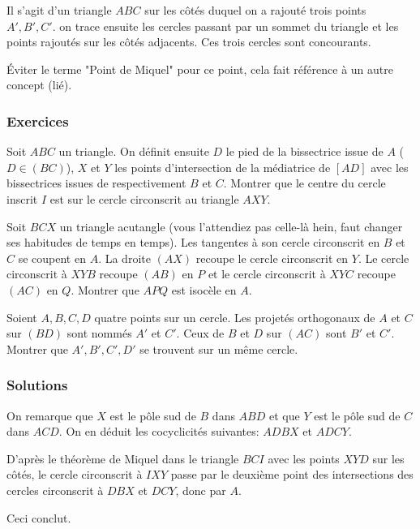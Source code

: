 Il s'agit d'un triangle $ABC$ sur les côtés duquel on a rajouté trois points $A',B',C'$. on trace ensuite les cercles passant par un sommet du triangle et les points rajoutés sur les côtés adjacents. Ces trois cercles sont concourants.

Éviter le terme "Point de Miquel" pour ce point, cela fait référence à un autre concept (lié).


\subsubsection{Exercices}


\begin{exo}
Soit $ABC$ un triangle. On définit ensuite $D$ le pied de la bissectrice issue de $A$ ($D\in(BC)$), $X$ et $Y$ les points d'intersection de la médiatrice de $[AD]$ avec les bissectrices issues de respectivement $B$ et $C$. Montrer que le centre du cercle inscrit $I$ est sur le cercle circonscrit au triangle $AXY$.
\end{exo}


\begin{exo}
Soit $BCX$ un triangle acutangle (vous l'attendiez pas celle-là hein, faut changer ses habitudes de temps en temps). Les tangentes à son cercle circonscrit en $B$ et $C$ se coupent en $A$. La droite $(AX)$ recoupe le cercle circonscrit en $Y$. Le cercle circonscrit à $XYB$ recoupe $(AB)$ en $P$ et le cercle circonscrit à $XYC$ recoupe $(AC)$ en $Q$. Montrer que $APQ$ est isocèle en $A$.
\end{exo}


\begin{exo}
Soient $A,B,C,D$ quatre points sur un cercle. Les projetés orthogonaux de $A$ et $C$ sur $(BD)$ sont nommés $A'$ et $C'$. Ceux de $B$ et $D$ sur $(AC)$ sont $B'$ et $C'$. Montrer que $A',B',C',D'$ se trouvent sur un même cercle.
\end{exo}


\subsubsection{Solutions}


\begin{sol}
On remarque que $X$ est le pôle sud de $B$ dans $ABD$ et que $Y$ est le pôle sud de $C$ dans $ACD$. On en déduit les cocyclicités suivantes: $ADBX$ et $ADCY$.

D'après le théorème de Miquel dans le triangle $BCI$ avec les points $XYD$ sur les côtés, le cercle circonscrit à $IXY$ passe par le deuxième point des intersections des cercles circonscrit à $DBX$ et $DCY$, donc par $A$.

Ceci conclut.
\end{sol}


